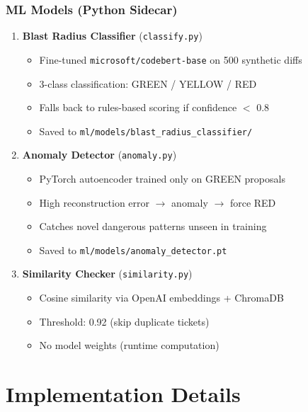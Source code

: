 \documentclass[11pt,a4paper]{article}
\begin{document}
\subsubsection{ML Models (Python Sidecar)}
\begin{enumerate}
    \item \textbf{Blast Radius Classifier} (\texttt{classify.py})
    \begin{itemize}
        \item Fine-tuned \texttt{microsoft/codebert-base} on 500 synthetic diffs
        \item 3-class classification: GREEN / YELLOW / RED
        \item Falls back to rules-based scoring if confidence $<$ 0.8
        \item Saved to \texttt{ml/models/blast\_radius\_classifier/}
    \end{itemize}
    
    \item \textbf{Anomaly Detector} (\texttt{anomaly.py})
    \begin{itemize}
        \item PyTorch autoencoder trained only on GREEN proposals
        \item High reconstruction error $\rightarrow$ anomaly $\rightarrow$ force RED
        \item Catches novel dangerous patterns unseen in training
        \item Saved to \texttt{ml/models/anomaly\_detector.pt}
    \end{itemize}
    
    \item \textbf{Similarity Checker} (\texttt{similarity.py})
    \begin{itemize}
        \item Cosine similarity via OpenAI embeddings + ChromaDB
        \item Threshold: 0.92 (skip duplicate tickets)
        \item No model weights (runtime computation)
    \end{itemize}
\end{enumerate}

\newpage
\section{Implementation Details}
\end{document}
